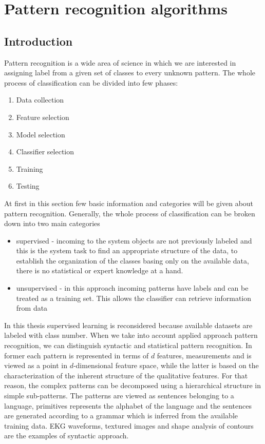 \section{Pattern recognition algorithms}
\label{cha:Introduction}
\subsection{Introduction}
Pattern recognition is a wide area of science in which we are interested in
assigning label from a given set of classes to every unknown pattern. The whole 
process of classification can be divided into few phases:
\begin{enumerate}
    \item Data collection
    \item Feature selection
    \item Model selection
    \item Classifier selection
    \item Training 
    \item Testing
\end{enumerate}
At first in this section few basic information and categories will be given 
about pattern recognition. Generally, the whole process of classification
can be broken down into two main categories
\begin{itemize}
    \item supervised - incoming to the system objects are not previously
        labeled and this is the system task to find an appropriate structure of
        the data, to establish the organization of the classes basing only on
        the available data, there is no statistical or expert knowledge at a
        hand.
    \item unsupervised - in this approach incoming patterns have labels and can
        be treated as a training set. This allows the classifier can retrieve
        information from data 
\end{itemize}
In this thesis supervised learning is reconsidered because available datasets 
are labeled with class number. When we take into account applied approach
pattern recognition, we can distinguish syntactic and statistical 
pattern recognition. In former each pattern is represented in terms of 
$d$ features, measurements and is viewed as a point in
$d$-dimensional feature space, while the latter
is  based on the characterization of the inherent structure of the 
qualitative features. For that  reason, the complex patterns can be
decomposed using a hierarchical structure in simple  sub-patterns.
The patterns are viewed as sentences belonging to a language, primitives
represents the alphabet of the language and the sentences are generated
according to a grammar which is inferred from the available training data.
EKG waveforms, textured images and shape analysis of contours are the examples
of syntactic approach.


